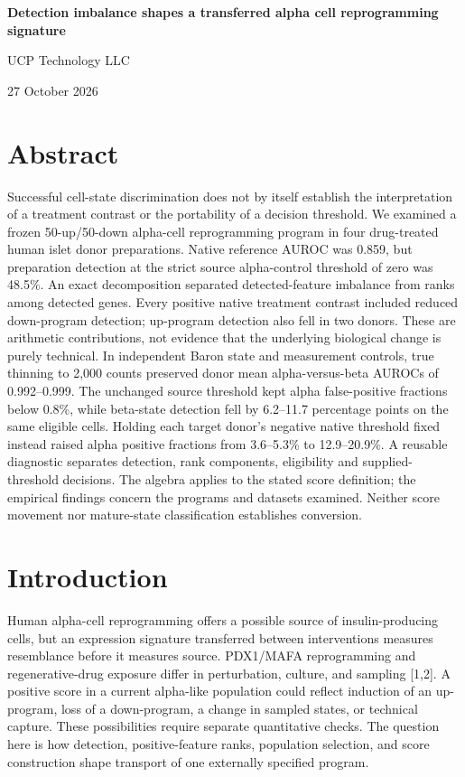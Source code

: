 \documentclass[11pt,letterpaper]{article}
\begin{document}
\begin{center}{\Large\bfseries Detection imbalance shapes a transferred alpha cell reprogramming signature}\par\vspace{8pt}UCP Technology LLC\par 27 October 2026\end{center}
\section*{Abstract}
Successful cell-state discrimination does not by itself establish the interpretation of a treatment contrast or the portability of a decision threshold. We examined a frozen 50-up/50-down alpha-cell reprogramming program in four drug-treated human islet donor preparations. Native reference AUROC was 0.859, but preparation detection at the strict source alpha-control threshold of zero was 48.5\%. An exact decomposition separated detected-feature imbalance from ranks among detected genes. Every positive native treatment contrast included reduced down-program detection; up-program detection also fell in two donors. These are arithmetic contributions, not evidence that the underlying biological change is purely technical. In independent Baron state and measurement controls, true thinning to 2,000 counts preserved donor mean alpha-versus-beta AUROCs of 0.992–0.999. The unchanged source threshold kept alpha false-positive fractions below 0.8\%, while beta-state detection fell by 6.2–11.7 percentage points on the same eligible cells. Holding each target donor’s negative native threshold fixed instead raised alpha positive fractions from 3.6–5.3\% to 12.9–20.9\%. A reusable diagnostic separates detection, rank components, eligibility and supplied-threshold decisions. The algebra applies to the stated score definition; the empirical findings concern the programs and datasets examined. Neither score movement nor mature-state classification establishes conversion.

\section*{Introduction}
Human alpha-cell reprogramming offers a possible source of insulin-producing cells, but an expression signature transferred between interventions measures resemblance before it measures source. PDX1/MAFA reprogramming and regenerative-drug exposure differ in perturbation, culture, and sampling [1,2]. A positive score in a current alpha-like population could reflect induction of an up-program, loss of a down-program, a change in sampled states, or technical capture. These possibilities require separate quantitative checks. The question here is how detection, positive-feature ranks, population selection, and score construction shape transport of one externally specified program.
\end{document}
